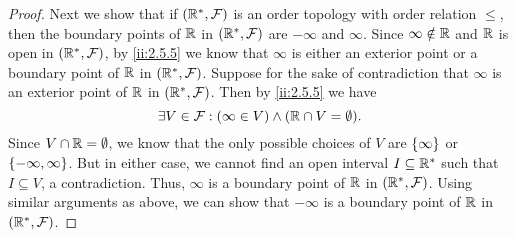 \begin{proof}
  Next we show that if \((\mathbb{R}^*, \mathcal{F})\) is an order topology with order relation \(\leq\), then the boundary points of \(\mathbb{R}\) in \((\mathbb{R}^*, \mathcal{F})\) are \(-\infty\) and \(\infty\).
  Since \(\infty \notin \mathbb{R}\) and \(\mathbb{R}\) is open in \((\mathbb{R}^*, \mathcal{F})\), by \cref{ii:2.5.5} we know that \(\infty\) is either an exterior point or a boundary point of \(\mathbb{R}\) in \((\mathbb{R}^*, \mathcal{F})\).
  Suppose for the sake of contradiction that \(\infty\) is an exterior point of \(\mathbb{R}\) in \((\mathbb{R}^*, \mathcal{F})\).
  Then by \cref{ii:2.5.5} we have
  \[
    \exists V \in \mathcal{F} : (\infty \in V) \land (\mathbb{R} \cap V = \emptyset).
  \]
  Since \(V \cap \mathbb{R} = \emptyset\), we know that the only possible choices of \(V\) are \(\left\lbrace\infty\right\rbrace\) or \(\left\lbrace-\infty, \infty\right\rbrace\).
  But in either case, we cannot find an open interval \(I \subseteq \mathbb{R}^*\) such that \(I \subseteq V\), a contradiction.
  Thus, \(\infty\) is a boundary point of \(\mathbb{R}\) in \((\mathbb{R}^*, \mathcal{F})\).
  Using similar arguments as above, we can show that \(-\infty\) is a boundary point of \(\mathbb{R}\) in \((\mathbb{R}^*, \mathcal{F})\).


\end{proof}
